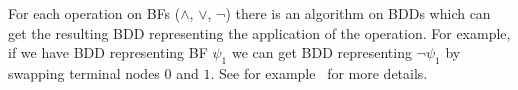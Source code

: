 \documentclass[
  digital, %
  twoside, %
  table,   %
  nolof,     %
  nolot,     %
]{fithesis3}
\theoremstyle{definition}
\newtheorem{example}{Example}
\theoremstyle{remark}
\begin{document}






For each operation on BFs (${\land}$, ${\lor}$, ${\neg}$) there is an algorithm on BDDs which can get the resulting BDD representing the application of the operation. For example, if we have BDD representing BF $\psi_1$ we can get BDD representing $\neg \psi_1$ by swapping terminal nodes $0$ and $1$. See for example~\cite{BDDdetails} for more details. %
\end{document}
